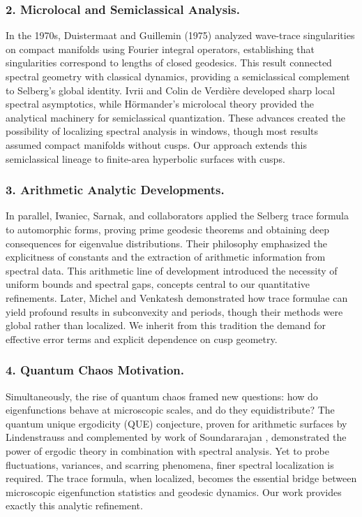 \subsubsection*{2. Microlocal and Semiclassical Analysis.}
In the 1970s, Duistermaat and Guillemin (1975) \cite{DG1975} 
analyzed wave-trace singularities on compact manifolds using Fourier integral operators, 
establishing that singularities correspond to lengths of closed geodesics. 
This result connected spectral geometry with classical dynamics, providing a semiclassical complement to Selberg’s global identity. 
Ivrii \cite{Ivrii1980} and Colin de Verdière \cite{Colin1978} developed sharp local spectral asymptotics, 
while Hörmander’s microlocal theory \cite{HormanderPDO} provided the analytical machinery for semiclassical quantization. 
These advances created the possibility of localizing spectral analysis in windows, 
though most results assumed compact manifolds without cusps. 
Our approach extends this semiclassical lineage to finite-area hyperbolic surfaces with cusps.

\subsubsection*{3. Arithmetic Analytic Developments.}
In parallel, Iwaniec, Sarnak, and collaborators \cite{Iwaniec2002,LuoSarnak1995} 
applied the Selberg trace formula to automorphic forms, proving prime geodesic theorems and 
obtaining deep consequences for eigenvalue distributions. 
Their philosophy emphasized the explicitness of constants and the extraction of arithmetic information from spectral data. 
This arithmetic line of development introduced the necessity of uniform bounds and spectral gaps, 
concepts central to our quantitative refinements. 
Later, Michel and Venkatesh \cite{MichelVenkatesh2010} demonstrated how trace formulae can yield profound results in subconvexity and periods, 
though their methods were global rather than localized. 
We inherit from this tradition the demand for effective error terms and explicit dependence on cusp geometry.

\subsubsection*{4. Quantum Chaos Motivation.}
Simultaneously, the rise of quantum chaos framed new questions: 
how do eigenfunctions behave at microscopic scales, and do they equidistribute? 
The quantum unique ergodicity (QUE) conjecture, proven for arithmetic surfaces by Lindenstrauss \cite{LindenstraussQUE} 
and complemented by work of Soundararajan \cite{SoundararajanQUE}, 
demonstrated the power of ergodic theory in combination with spectral analysis. 
Yet to probe fluctuations, variances, and scarring phenomena, finer spectral localization is required. 
The trace formula, when localized, becomes the essential bridge between microscopic eigenfunction statistics and geodesic dynamics. 
Our work provides exactly this analytic refinement.

